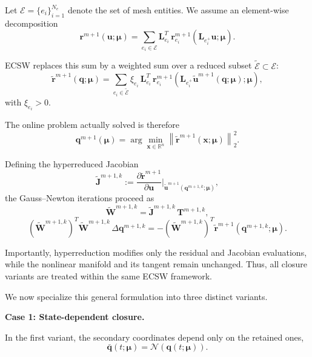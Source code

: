 \documentclass[11pt]{article}
\begin{document}
Let $\mathcal E=\{e_i\}_{i=1}^{N_e}$ denote the set of mesh entities. We assume an element-wise decomposition
\begin{equation}
\mathbf r^{m+1}(\mathbf u;\bm\mu)
=
\sum_{e_i\in\mathcal E}
\mathbf L_{e_i}^T\,
\mathbf r_{e_i}^{m+1}\!\left(\mathbf L_{e_i^+}\mathbf u;\bm\mu\right).
\end{equation}

ECSW replaces this sum by a weighted sum over a reduced subset $\widetilde{\mathcal E}\subset\mathcal E$:
\begin{equation}
\widetilde{\mathbf r}^{m+1}(\mathbf q;\bm\mu)
=
\sum_{e_i\in\widetilde{\mathcal E}}
\xi_{e_i}\,
\mathbf L_{e_i}^T\,
\mathbf r_{e_i}^{m+1}\!\left(
\mathbf L_{e_i^+}\tilde{\mathbf u}^{m+1}(\mathbf q;\bm\mu);\bm\mu
\right),
\end{equation}
with $\xi_{e_i}>0$.

The online problem actually solved is therefore
\begin{equation}
\mathbf q^{m+1}(\bm\mu)
=
\arg\min_{\mathbf x\in\mathbb R^{n}}
\left\|
\widetilde{\mathbf r}^{m+1}(\mathbf x;\bm\mu)
\right\|_2^2.
\end{equation}

Defining the hyperreduced Jacobian
\[
\widetilde{\mathbf J}^{m+1,k}
:=
\frac{\partial \widetilde{\mathbf r}^{m+1}}{\partial \mathbf u}
\bigg|_{\tilde{\mathbf u}^{m+1}(\mathbf q^{m+1,k};\bm\mu)},
\]
the Gauss--Newton iterations proceed as
\[
\widetilde{\mathbf W}^{m+1,k}
=
\widetilde{\mathbf J}^{m+1,k}\,\mathbf T^{m+1,k},
\]
\begin{equation}
(\widetilde{\mathbf W}^{m+1,k})^T\widetilde{\mathbf W}^{m+1,k}\,\Delta\mathbf q^{m+1,k}
=
-(\widetilde{\mathbf W}^{m+1,k})^T
\widetilde{\mathbf r}^{m+1}(\mathbf q^{m+1,k};\bm\mu).
\end{equation}

Importantly, hyperreduction modifies only the residual and Jacobian evaluations, while the nonlinear manifold and its tangent remain unchanged. Thus, all closure variants are treated within the same ECSW framework.

We now specialize this general formulation into three distinct variants.

\medskip
\noindent
\textbf{Case 1: State-dependent closure.}

In the first variant, the secondary coordinates depend only on the retained ones,
\begin{equation}
\bar{\mathbf q}(t;\bm\mu)
=
\mathcal N(\mathbf q(t;\bm\mu)).
\end{equation}
\end{document}
